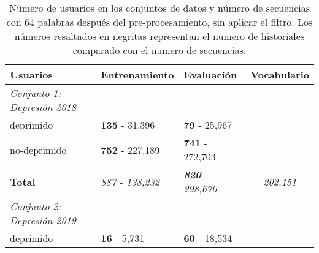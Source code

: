 \begin{table}[!hbt]
\caption{Número de usuarios en los conjuntos de datos y número de secuencias con 64 palabras después del pre-procesamiento, sin aplicar el filtro. Los números resaltados en negritas representan el numero de historiales comparado con el numero de secuencias.} \label{table:original_users}

\begin{center}

\begin{tabular}{llll}
\hline
\rowcolor[HTML]{FFFFFF} 
\textbf{Usuarios}                                           & \textbf{Entrenamiento}                       & \textbf{Evaluación}                          & \textbf{Vocabulario}                                         \\ \hline
\rowcolor[HTML]{EFEFEF} 
\textit{Conjunto 1: Depresión 2018}                         & \multicolumn{1}{c}{\cellcolor[HTML]{EFEFEF}} & \multicolumn{1}{c}{\cellcolor[HTML]{EFEFEF}} &                                                              \\ \hline
\rowcolor[HTML]{FFFFFF} 
deprimido                                                   & \textbf{135} - 31,396                                 & \textbf{79} - 25,967                                  &                                                              \\ \hline
\rowcolor[HTML]{FFFFFF} 
no-deprimido                                                & \textbf{752} - 227,189                                & \textbf{741} - 272,703                                &                                                              \\ \hline
\rowcolor[HTML]{FFFFFF} 
\textbf{Total}                                              & \textit{887 - 138,232}                       & \textit{\textbf{820} - 298,670}                       & \multicolumn{1}{c}{\cellcolor[HTML]{FFFFFF}\textit{202,151}} \\ \hline
\rowcolor[HTML]{EFEFEF} 
\cellcolor[HTML]{EFEFEF}\textit{Conjunto 2: Depresión 2019} &                                              &                                              &                                                              \\ \hline
\rowcolor[HTML]{FFFFFF} 
deprimido                                                   & \textbf{16} - 5,731                                   & \textbf{60} - 18,534                                  &                                                              \\ \hline

\end{tabular}
\end{center}
\end{table}
